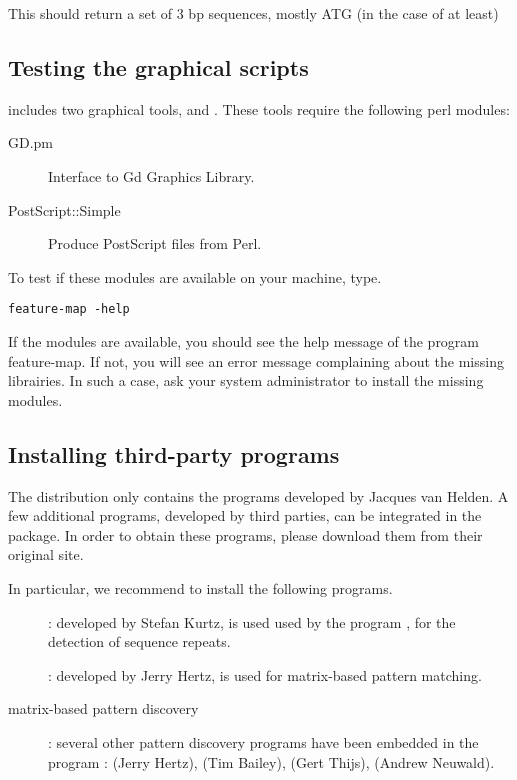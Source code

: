 \documentclass{article}
\begin{document}
This should return a set of 3 bp sequences, mostly ATG (in the case of
 at least)

\subsection{Testing the graphical scripts}

\RSAT includes two graphical tools,  and
. These tools require the following  perl modules: 

\begin{description}
\item[GD.pm] Interface to Gd Graphics Library.
\item[PostScript::Simple]  Produce PostScript files from Perl.
\end{description}

To test if these modules are available on your machine, type.

\begin{verbatim}
feature-map -help
\end{verbatim}

If the modules are available, you should see the help message of the
program feature-map. If not, you will see an error message complaining
about the missing librairies. In such a case, ask your system
administrator to install the missing modules.

\subsection{Installing third-party programs}

The \RSAT distribution only contains the programs developed by Jacques
van Helden. A few additional programs, developed by third parties, can
be integrated in the package. In order to obtain these programs,
please download them from their original site.

In particular, we recommend to install the following programs.

\begin{description}
\item[]: developed by Stefan Kurtz, is used used by the
program , for the detection of sequence repeats.

\item[]: developed by Jerry Hertz, is used for
  matrix-based pattern matching.

\item[matrix-based pattern discovery]: several other pattern discovery
  programs have been embedded in the \RSAT program
  : 
 (Jerry Hertz),
 (Tim Bailey),
 (Gert Thijs),
 (Andrew Neuwald).

\end{description}
\end{document}
